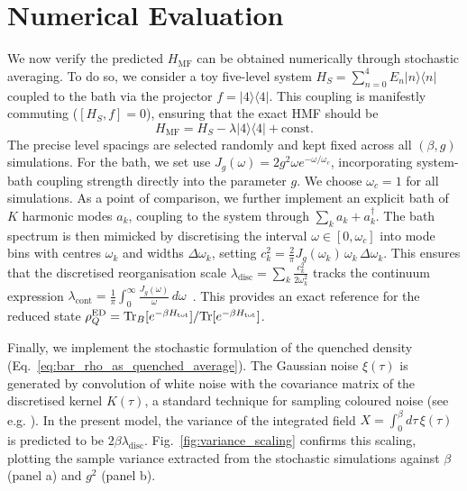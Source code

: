 \section{Numerical Evaluation}
\label{sec:numerical}
We now verify the predicted $H_{\mathrm{MF}}$ can be obtained numerically through stochastic averaging. To do so, we consider a toy five-level system $H_S = \sum_{n=0}^4 E_n |n\rangle\langle n|$ coupled to the bath via the projector $f = |4\rangle\langle 4|$. This coupling is manifestly commuting ($[H_S, f] = 0$), ensuring that the exact HMF should be
\begin{equation}
    H_{\mathrm{MF}} = H_S - \lambda |4\rangle\langle 4| + \mathrm{const}.
\end{equation}
The precise level spacings are selected randomly and kept fixed across all $(\beta,g)$ simulations. For the bath, we set use $J_g(\omega)=2 g^2\omega e^{-\omega/\omega_c}$, incorporating system-bath coupling strength directly into the parameter $g$. We choose $\omega_c=1$ for all simulations. As a point of comparison, we further implement an explicit bath of $K$ harmonic modes $a_k$, coupling to the system through $\sum_k a_k +a_k^\dagger$. The bath spectrum is then mimicked by discretising the interval $\omega\in[0, \omega_c]$ into mode bins with centres $\omega_k$ and widths $\Delta\omega_k$, setting $c_k^2=\frac{2}{\pi}J_g(\omega_k)\,\omega_k\,\Delta\omega_k$. This ensures that the discretised reorganisation scale $\lambda_{\mathrm{disc}}=\sum_k\frac{c_k^2}{2\omega_k^2}$ tracks the continuum expression $\lambda_{\mathrm{cont}}=\frac{1}{\pi}\int_0^\infty\frac{J_g(\omega)}{\omega}\,d\omega$~\cite{weissQuantumDissipativeSystems2012}. This provides an exact reference for the reduced state $\rho_Q^{\mathrm{ED}}=\mathrm{Tr}_B[e^{-\beta H_{\mathrm{tot}}}]/\mathrm{Tr}[e^{-\beta H_{\mathrm{tot}}}]$. 

Finally, we implement the stochastic formulation of the quenched density (Eq.~\ref{eq:bar_rho_as_quenched_average}). The Gaussian noise $\xi(\tau)$ is generated by convolution of white noise with the covariance matrix of the discretised kernel $K(\tau)$, a standard technique for sampling coloured noise (see e.g. \cite{mccaulDrivingSpinbosonModels2018a}). In the present model, the variance of the integrated field $X=\int_0^\beta d\tau\,\xi(\tau)$ is predicted to be $2\beta\lambda_{\mathrm{disc}}$. Fig.~\ref{fig:variance_scaling} confirms this scaling, plotting the sample variance extracted from the stochastic simulations against $\beta$ (panel a) and $g^2$ (panel b).


